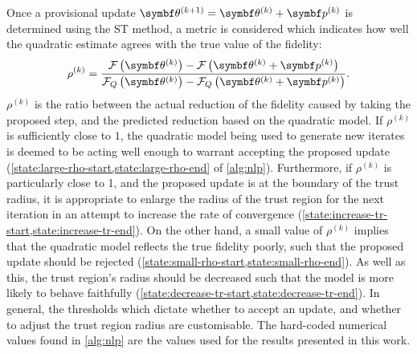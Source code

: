 Once a provisional update $\bthkplusone = \bthk + \bpk$ is determined using the
\ac{ST} method, a metric is considered which indicates how well the
quadratic estimate agrees with the true value of the fidelity:
\begin{equation}
    \rho^{(k)} = \frac
        {\Fthk - \Fthkpk}
        {\FQthk - \FQthkpk}.
\end{equation}
$\rho^{(k)}$ is the ratio between the actual reduction of the fidelity caused
by taking the proposed step, and the predicted reduction based on the quadratic
model. If $\rho^{(k)}$ is sufficiently close to $1$, the quadratic model being
used to generate new iterates is deemed to be acting well enough to warrant
accepting the proposed update
(\cref{state:large-rho-start,state:large-rho-end} of
\cref{alg:nlp}).
Furthermore, if $\rho^{(k)}$ is particularly close to 1, and the proposed
update is at the boundary of the trust radius, it is appropriate to enlarge the
radius of the trust region for the next iteration in an attempt to increase the
rate of convergence
(\cref{state:increase-tr-start,state:increase-tr-end}).
On the other hand, a small value of $\rho^{(k)}$ implies that the
quadratic model reflects the true fidelity poorly, such that the proposed
update should be rejected
(\cref{state:small-rho-start,state:small-rho-end}).
As well as this, the trust region's radius should be
decreased such that the model is more likely to behave faithfully
(\cref{state:decrease-tr-start,state:decrease-tr-end}). In general, the
thresholds which dictate whether to accept an update, and whether to adjust the
trust region radius are customisable. The hard-coded numerical values found in
\cref{alg:nlp} are the values used for the results presented in this work.

